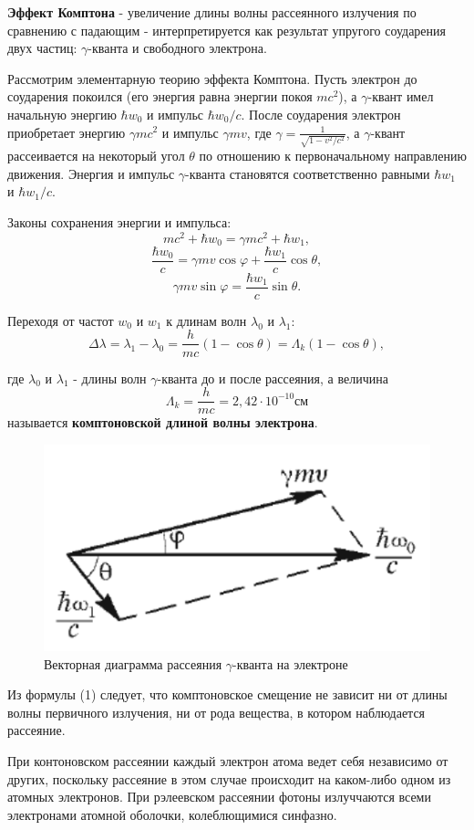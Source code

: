 \documentclass[a4paper,12pt]{article}
\begin{document}
\textbf{Эффект Комптона} - увеличение длины волны рассеянного излучения по сравнению с падающим - интерпретируется как результат упругого соударения двух частиц: $\gamma$-кванта и свободного электрона.

Рассмотрим элементарную теорию эффекта Комптона. Пусть электрон до соударения покоился (его энергия равна энергии покоя $mc^2$), а $\gamma$-квант имел начальную энергию $\hbar w_0$ и импульс $\hbar w_0/c$. После соударения электрон приобретает энергию $\gamma mc^2$ и импульс $\gamma mv$, где $\gamma = \frac{1}{\sqrt{1-v^2/c^2}}$, а $\gamma$-квант рассеивается на некоторый угол $\theta$ по отношению к первоначальному направлению движения. Энергия и импульс $\gamma$-кванта становятся соответственно равными $\hbar w_1$ и $\hbar w_1/c$.

Законы сохранения энергии и импульса:
$$
mc^2+\hbar w_0 = \gamma mc^2 + \hbar w_1,
$$
$$
\frac{\hbar w_0}{c} = \gamma mv\cos{\varphi} + \frac{\hbar w_1}{c}\cos{\theta},
$$
$$
\gamma mv\sin{\varphi} = \frac{\hbar w_1}{c}\sin{\theta}.
$$

Переходя от частот $w_0$ и $w_1$ к длинам волн $\lambda_0$ и $\lambda_1$:
\begin{equation}
    \Delta\lambda = \lambda_1-\lambda_0 = \frac{h}{mc}(1-\cos{\theta})=\Lambda_k(1-\cos{\theta}),
\end{equation}\label{1}

где $\lambda_0$ и $\lambda_1$ - длины волн $\gamma$-кванта до и после рассеяния, а величина
$$
\Lambda_k = \frac{h}{mc}=2,42\cdot 10^{-10}\text{см}
$$
называется \textbf{комптоновской длиной волны электрона}.

\begin{figure}[h]
\centering
\includegraphics[width=0.4\linewidth]{img1.png}
\caption{Векторная диаграмма рассеяния $\gamma$-кванта на электроне}
\label{img1}
\end{figure}

Из формулы (1) следует, что комптоновское смещение не зависит ни от длины волны первичного излучения, ни от рода вещества, в котором наблюдается рассеяние.

При контоновском рассеянии каждый электрон атома ведет себя независимо от других, поскольку рассеяние в этом случае происходит на каком-либо одном из атомных электронов. При рэлеевском рассеянии фотоны излуччаются всеми электронами атомной оболочки, колеблющимися синфазно.
\end{document}
